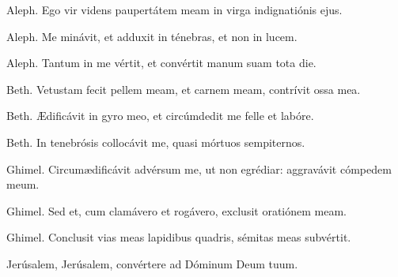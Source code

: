 
Aleph. 
Ego vir videns paupertátem meam in virga indignatiónis ejus.

Aleph. 
Me minávit, et adduxit in ténebras, et non in lucem.

Aleph. 
Tantum in me vértit, et convértit manum suam tota die.

Beth. 
Vetustam fecit pellem meam, et carnem meam, contrívit ossa mea.

Beth. 
Ædificávit in gyro meo, et circúmdedit me felle et labóre.

Beth. 
In tenebrósis collocávit me, quasi mórtuos sempiternos.

Ghimel. 
Circumædificávit advérsum me, ut non egrédiar: aggravávit cómpedem meum.

Ghimel. 
Sed et, cum clamávero et rogávero, exclusit oratiónem meam.

Ghimel. 
Conclusit vias meas lapidibus quadris, sémitas meas subvértit.

Jerúsalem, Jerúsalem, convértere ad Dóminum Deum tuum.
\par